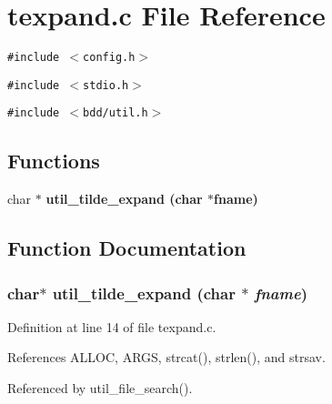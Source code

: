 \section{texpand.c File Reference}
\label{texpand_8c}
{\tt \#include $<$config.h$>$}\par
{\tt \#include $<$stdio.h$>$}\par
{\tt \#include $<$bdd/util.h$>$}\par
\subsection*{Functions}
\begin{CompactItemize}
\item 
char $\ast$ \bf{util\_\-tilde\_\-expand} (char $\ast$fname)
\end{CompactItemize}


\subsection{Function Documentation}
\subsubsection{\setlength{\rightskip}{0pt plus 5cm}char$\ast$ util\_\-tilde\_\-expand (char $\ast$ {\em fname})}\label{texpand_8c_bb7a710e0ef27754f6a0fd9bddc2f0ea}




Definition at line 14 of file texpand.c.

References ALLOC, ARGS, strcat(), strlen(), and strsav.

Referenced by util\_\-file\_\-search().